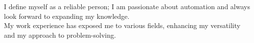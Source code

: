 \textcolor{sidebartext}{
I define myself as a reliable person;
I am passionate about automation and always look forward to expanding my knowledge. \\
My work experience has exposed me to various fields, enhancing my versatility and my approach to problem-solving.
}